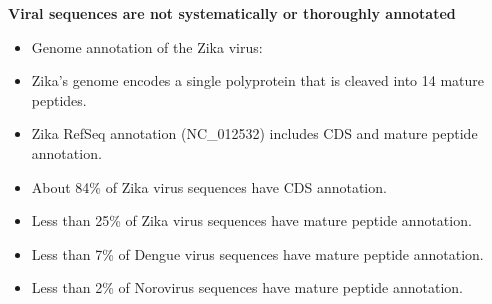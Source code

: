 \documentclass[landscape]{slides}
\begin{document}
\begin{slide}
\begin{center}
\textbf{Viral sequences are not systematically or thoroughly annotated}
\end{center}
\medskip

\small
\begin{itemize}
\item Genome annotation of the Zika virus:
\end{itemize}  


\begin{itemize}
\item Zika's genome encodes a single polyprotein that is cleaved into 14 mature peptides.
\item Zika RefSeq annotation (NC\_012532) includes CDS and mature peptide annotation.
\item About 84\% of Zika virus sequences have CDS annotation.
\item Less than 25\% of Zika virus sequences have mature peptide annotation.
\item Less than 7\% of Dengue virus sequences have mature peptide annotation.
\item Less than 2\% of Norovirus sequences have mature peptide annotation.
\end{itemize}

\vfill
\tiny {}
\end{slide}
\end{document}

